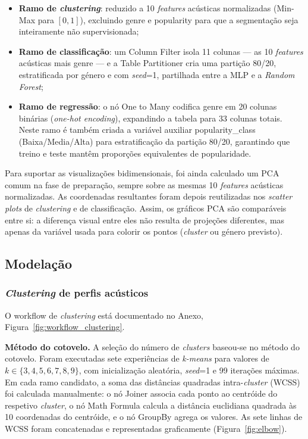 \documentclass[11pt,a4paper]{article}
\newcommand{\code}[1]{{\ttfamily\hyphenchar\font=45\relax #1}}
\begin{document}
\begin{itemize}
    \item \textbf{Ramo de \textit{clustering}}: reduzido a 10 \textit{features} acústicas normalizadas (Min-Max para $[0,1]$), excluindo \code{genre} e \code{popularity} para que a segmentação seja inteiramente não supervisionada;
    \item \textbf{Ramo de classificação}: um \code{Column Filter} isola 11 colunas --- as 10 \textit{features} acústicas mais \code{genre} --- e a \code{Table Partitioner} cria uma partição 80/20, estratificada por género e com \textit{seed}=1, partilhada entre a MLP e a \textit{Random Forest};
    \item \textbf{Ramo de regressão}: o nó \code{One to Many} codifica \code{genre} em 20 colunas binárias (\textit{one-hot encoding}), expandindo a tabela para 33 colunas totais. Neste ramo é também criada a variável auxiliar \code{popularity\_class} (Baixa/Media/Alta) para estratificação da partição 80/20, garantindo que treino e teste mantêm proporções equivalentes de popularidade.
\end{itemize}

Para suportar as visualizações bidimensionais, foi ainda calculado um PCA comum na fase de preparação, sempre sobre as mesmas 10 \textit{features} acústicas normalizadas. As coordenadas resultantes foram depois reutilizadas nos \textit{scatter plots} de \textit{clustering} e de classificação. Assim, os gráficos PCA são comparáveis entre si: a diferença visual entre eles não resulta de projeções diferentes, mas apenas da variável usada para colorir os pontos (\textit{cluster} ou género previsto).

\subsection{Modelação}

\subsubsection{\textit{Clustering} de perfis acústicos}

O workflow de \textit{clustering} está documentado no Anexo, Figura~\ref{fig:workflow_clustering}.

\textbf{Método do cotovelo.}
A seleção do número de \textit{clusters} baseou-se no método do cotovelo. Foram executadas sete experiências de \textit{k-means} para valores de $k \in \{3, 4, 5, 6, 7, 8, 9\}$, com inicialização aleatória, \textit{seed}=1 e 99 iterações máximas. Em cada ramo candidato, a soma das distâncias quadradas intra-\textit{cluster} (WCSS) foi calculada manualmente: o nó \code{Joiner} associa cada ponto ao centróide do respetivo \textit{cluster}, o nó \code{Math Formula} calcula a distância euclidiana quadrada às 10 coordenadas do centróide, e o nó \code{GroupBy} agrega os valores. As sete linhas de WCSS foram concatenadas e representadas graficamente (Figura~\ref{fig:elbow}).
\end{document}
